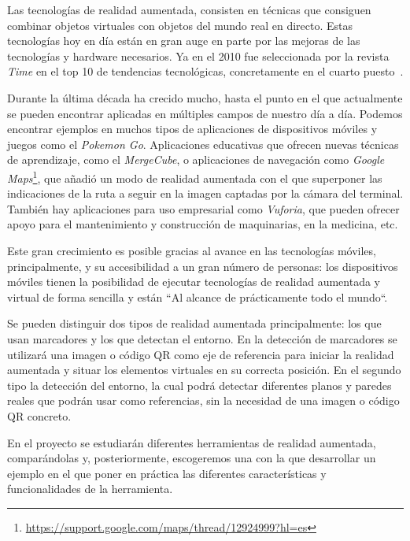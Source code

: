 
Las tecnologías de realidad aumentada, consisten en técnicas que consiguen combinar objetos virtuales con objetos del mundo real en directo. 
Estas tecnologías hoy en día están en gran auge en parte por las mejoras de las tecnologías y hardware necesarios. Ya en el 2010 fue seleccionada por la revista \textit{Time} en el top 10 de tendencias tecnológicas, concretamente en el cuarto puesto~\cite{fletcher_2010}. 

Durante la última década ha crecido mucho, hasta el punto en el que actualmente se pueden encontrar aplicadas en múltiples campos de nuestro día a día. Podemos encontrar ejemplos en muchos tipos de aplicaciones de dispositivos móviles y juegos como el \textit{Pokemon Go}. Aplicaciones educativas que ofrecen nuevas técnicas de aprendizaje, como el \textit{MergeCube}, o aplicaciones de navegación como \textit{Google Maps}\footnote{\url{https://support.google.com/maps/thread/12924999?hl=es}}, que añadió un modo de realidad aumentada con el que superponer las indicaciones de la ruta a seguir en la imagen captadas por la cámara del terminal. También hay aplicaciones para uso empresarial como \textit{Vuforia}, que pueden ofrecer apoyo para el mantenimiento y construcción de maquinarias, en la medicina, etc.

Este gran crecimiento es posible gracias al avance en las tecnologías móviles, principalmente, y su accesibilidad a un gran número de personas: los dispositivos móviles tienen la posibilidad de ejecutar tecnologías de realidad aumentada y virtual de forma sencilla y están ``Al alcance de prácticamente todo el mundo``.




Se pueden distinguir dos tipos de realidad aumentada principalmente: los que usan marcadores y los que detectan el entorno. En la detección de marcadores se utilizará una imagen o código QR como eje de referencia para iniciar la realidad aumentada y situar los elementos virtuales en su correcta posición. 
En el segundo tipo la detección del entorno, la cual podrá detectar diferentes planos y paredes reales que podrán usar como referencias, sin la necesidad de una imagen o código QR concreto.


En el proyecto se estudiarán diferentes herramientas de realidad aumentada, comparándolas y, posteriormente, escogeremos una con la que desarrollar un ejemplo en el que poner en práctica las diferentes características y funcionalidades de la herramienta.


